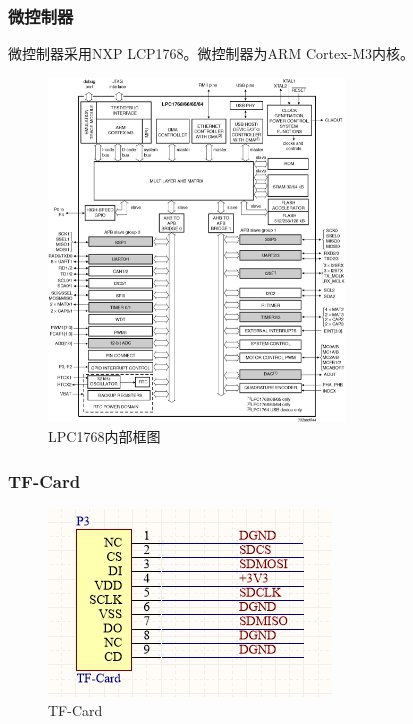 \documentclass[16pt,a4paper]{article}
\begin{document}
\subsubsection{微控制器}
微控制器采用NXP LCP1768。微控制器为ARM Cortex-M3内核。
\begin{figure}[H]
\centering
\includegraphics[width=0.7\textwidth]{LPC1768.png}
\caption{LPC1768内部框图} 
\end{figure}

\subsubsection{TF-Card}
\begin{figure}[H]
\centering
\includegraphics[scale = 0.8]{TF-Card.png}
\caption{TF-Card} 
\end{figure}
\end{document}
